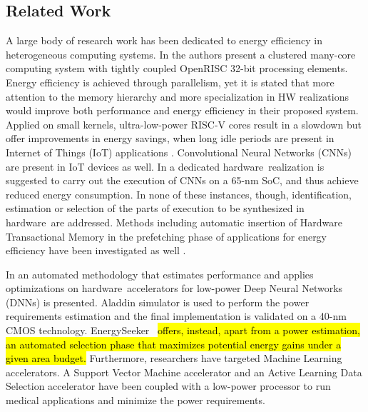 \documentclass[]{usiinfthesis}
\newcommand{\eseeker}{{EnergySeeker}}
\newcommand{\HW}{{hardware}}
\begin{document}
\subsection{Related Work}

A large body of research work has been dedicated to energy efficiency in heterogeneous computing
systems. In \cite{ContiSep16} \cite{MelpignanoJune12} the authors present a clustered many-core 
computing system with tightly coupled OpenRISC 32-bit processing elements. Energy efficiency is 
achieved through parallelism, yet it is stated that more attention to the memory hierarchy and 
more specialization in HW realizations would improve both performance and energy efficiency in 
their proposed system. Applied on small kernels, ultra-low-power RISC-V cores result in a slowdown 
but offer improvements in energy savings, when long idle periods are present in Internet of 
Things (IoT) applications \cite{SchiavoneSep17}. Convolutional Neural Networks (CNNs) are 
present in IoT devices as well. In \cite{PulliniJan17} a dedicated \HW\ realization is 
suggested to carry out the execution of CNNs on a 65-nm SoC, and thus achieve reduced energy
consumption. In none of these instances, though, identification, estimation or selection of
the parts of execution to be synthesized in \HW\ are addressed. Methods including automatic
insertion of Hardware Transactional Memory in the prefetching phase of applications for
energy efficiency have been investigated as well \cite{ZacharopoulosMay15}.\par

In \cite{ReagenJun16} an automated methodology that estimates performance and 
applies optimizations on \HW\ accelerators for low-power Deep Neural Networks (DNNs) is presented. 
Aladdin simulator \cite{ShaoJul14} is used to perform the power requirements estimation and the 
final implementation is validated on a 40-nm CMOS technology. \eseeker\ 
\hl{
offers, instead, apart from a 
power estimation, an automated selection phase that maximizes potential energy gains under a 
given area budget. 
}
Furthermore, researchers have targeted 
Machine Learning accelerators. A Support Vector Machine accelerator and an Active Learning Data Selection 
accelerator have been coupled with a low-power processor \cite{LeeApr13} to run medical
applications and minimize the power requirements.\par
\end{document}
